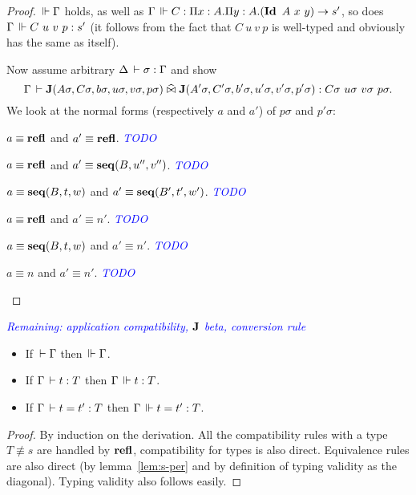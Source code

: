 \documentclass[a4paper,english]{lipics-utf8x}
\newcommand\meta[1]{\noindent\textcolor{blue}{\emph{#1}}}
\begin{document}
  \begin{proof}
    $\,\Vdash \Gamma$ holds, as well as
    $\Gamma \,\Vdash C : \Pi x:A. \Pi y:A. (\operatorname{\mathbf{Id}~} A\ x\ y) \to s'$,
    so does $\Gamma \,\Vdash C\ u\ v\ p : s'$ (it follows from the fact that
    $C\ u\ v\ p$ is well-typed and obviously has the same as itself).

    Now assume arbitrary $\Delta \,\vdash \sigma : \Gamma$ and show
    \[\Gamma \,\vdash \operatorname{\mathbf{J}}(A \sigma, C \sigma, b \sigma, u \sigma, v \sigma, p \sigma)
    \mathrel{\widehat{\bowtie}} \operatorname{\mathbf{J}}(A' \sigma, C' \sigma, b' \sigma, u' \sigma, v' \sigma, p' \sigma) :
    C \sigma\ u \sigma\ v \sigma\ p \sigma.\]
    We look at the normal forms (respectively $a$ and $a'$) of $p \sigma$ and
    $p' \sigma$:
    \begin{caselist}
      \nextcase $a \equiv \operatorname{\mathbf{refl}}$ and $a' \equiv \operatorname{\mathbf{refl}}$.
      \meta{TODO}

      \nextcase $a \equiv \operatorname{\mathbf{refl}}$ and $a' \equiv \operatorname{\mathbf{seq}}(B,u'',v'')$.
      \meta{TODO}

      \nextcase $a \equiv \operatorname{\mathbf{seq}}(B,t,w)$ and $a' \equiv \operatorname{\mathbf{seq}}(B',t',w')$.
      \meta{TODO}

      \nextcase $a \equiv \operatorname{\mathbf{refl}}$ and $a' \equiv n'$.
      \meta{TODO}

      \nextcase $a \equiv \operatorname{\mathbf{seq}}(B,t,w)$ and $a' \equiv n'$.
      \meta{TODO}

      \nextcase $a \equiv n$ and $a' \equiv n'$.
      \meta{TODO}
    \end{caselist}
  \end{proof}

  \meta{Remaining: application compatibility, $\operatorname{\mathbf{J}}$ beta,
  conversion rule}

  \begin{theorem}
    \leavevmode
    \begin{itemize}
      \item If $\,\vdash \Gamma$ then $\,\Vdash \Gamma$.
      \item If $\Gamma \,\vdash t : T$ then $\Gamma \,\Vdash t : T$.
      \item If $\Gamma \,\vdash t = t' : T$ then $\Gamma \,\Vdash t = t' : T$.
    \end{itemize}
  \end{theorem}

  \begin{proof}
    By induction on the derivation.
    All the compatibility rules with a type $T \nequiv s$ are handled by
    $\operatorname{\mathbf{refl}}$, compatibility for types is also direct.
    Equivalence rules are also direct (by lemma~\ref{lem:s-per} and by
    definition of typing validity as the diagonal).
    Typing validity also follows easily.
  \end{proof}
\end{document}
